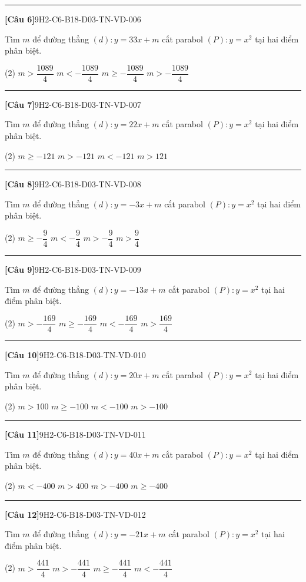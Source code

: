 \documentclass[12pt,a4paper]{article}
\newif\ifloigiai
\newenvironment{cauhoi}[2]{%
  \par\medskip\noindent\rule{\textwidth}{0.4pt}\par\nopagebreak
  \noindent\textbf{[#1]}\hfill{\scriptsize\ttfamily #2}\par\nopagebreak\smallskip}{\par}
\newcommand{\dapan}[1]{\ifloigiai\par\smallskip\noindent\textit{Đáp án:} \textbf{#1}\par\fi}
\begin{document}
\begin{cauhoi}{Câu 6}{9H2-C6-B18-D03-TN-VD-006}
Tìm $m$ để đường thẳng $(d): y=33x+m$ cắt parabol $(P): y=x^{2}$ tại hai điểm phân biệt.
\begin{tasks}(2)
\task $m>\dfrac{1089}{4}$
\task $m<-\dfrac{1089}{4}$
\task $m\ge -\dfrac{1089}{4}$
\task $m>-\dfrac{1089}{4}$
\end{tasks}
\dapan{D}
\end{cauhoi}
\begin{cauhoi}{Câu 7}{9H2-C6-B18-D03-TN-VD-007}
Tìm $m$ để đường thẳng $(d): y=22x+m$ cắt parabol $(P): y=x^{2}$ tại hai điểm phân biệt.
\begin{tasks}(2)
\task $m\ge -121$
\task $m>-121$
\task $m<-121$
\task $m>121$
\end{tasks}
\dapan{B}
\end{cauhoi}
\begin{cauhoi}{Câu 8}{9H2-C6-B18-D03-TN-VD-008}
Tìm $m$ để đường thẳng $(d): y=-3x+m$ cắt parabol $(P): y=x^{2}$ tại hai điểm phân biệt.
\begin{tasks}(2)
\task $m\ge -\dfrac{9}{4}$
\task $m<-\dfrac{9}{4}$
\task $m>-\dfrac{9}{4}$
\task $m>\dfrac{9}{4}$
\end{tasks}
\dapan{C}
\end{cauhoi}
\begin{cauhoi}{Câu 9}{9H2-C6-B18-D03-TN-VD-009}
Tìm $m$ để đường thẳng $(d): y=-13x+m$ cắt parabol $(P): y=x^{2}$ tại hai điểm phân biệt.
\begin{tasks}(2)
\task $m>-\dfrac{169}{4}$
\task $m\ge -\dfrac{169}{4}$
\task $m<-\dfrac{169}{4}$
\task $m>\dfrac{169}{4}$
\end{tasks}
\dapan{A}
\end{cauhoi}
\begin{cauhoi}{Câu 10}{9H2-C6-B18-D03-TN-VD-010}
Tìm $m$ để đường thẳng $(d): y=20x+m$ cắt parabol $(P): y=x^{2}$ tại hai điểm phân biệt.
\begin{tasks}(2)
\task $m>100$
\task $m\ge -100$
\task $m<-100$
\task $m>-100$
\end{tasks}
\dapan{D}
\end{cauhoi}
\begin{cauhoi}{Câu 11}{9H2-C6-B18-D03-TN-VD-011}
Tìm $m$ để đường thẳng $(d): y=40x+m$ cắt parabol $(P): y=x^{2}$ tại hai điểm phân biệt.
\begin{tasks}(2)
\task $m<-400$
\task $m>400$
\task $m>-400$
\task $m\ge -400$
\end{tasks}
\dapan{C}
\end{cauhoi}
\begin{cauhoi}{Câu 12}{9H2-C6-B18-D03-TN-VD-012}
Tìm $m$ để đường thẳng $(d): y=-21x+m$ cắt parabol $(P): y=x^{2}$ tại hai điểm phân biệt.
\begin{tasks}(2)
\task $m>\dfrac{441}{4}$
\task $m>-\dfrac{441}{4}$
\task $m\ge -\dfrac{441}{4}$
\task $m<-\dfrac{441}{4}$
\end{tasks}
\dapan{B}
\end{cauhoi}
\end{document}
